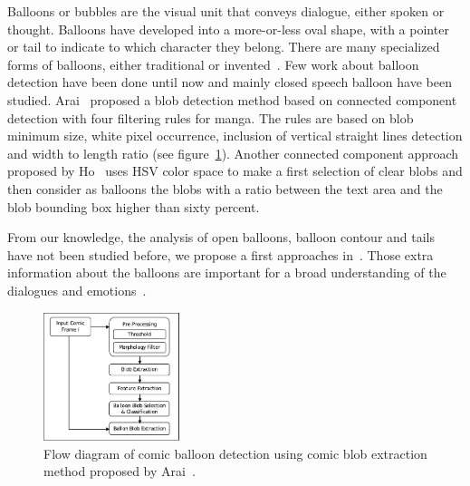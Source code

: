 Balloons or bubbles are the visual unit that conveys dialogue, either spoken or thought.
Balloons have developed into a more-or-less oval shape, with a pointer or tail to indicate to which character they belong.
There are many specialized forms of balloons, either traditional or invented~\cite{Marx2006Writing}.
Few work about balloon detection have been done until now and mainly closed speech balloon have been studied.
Arai~\cite{Arai11} proposed a blob detection method based on connected component detection with four filtering rules for manga.
The rules are based on blob minimum size, white pixel occurrence, inclusion of vertical straight lines detection and width to length ratio (see figure~\ref{fig:Arai_balloon_extraction_process}).
Another connected component approach proposed by Ho~\cite{Ho2012} uses HSV color space to make a first selection of clear blobs and then consider as balloons the blobs with a ratio between the text area and the blob bounding box higher than sixty percent.

From our knowledge, the analysis of open balloons, balloon contour and tails have not been studied before, we propose a first approaches in~.
Those extra information about the balloons are important for a broad understanding of the dialogues and emotions~\cite{millidge2009comic}.





 \begin{figure}[!ht]  %
   \centering
  \includegraphics[trim= 0px 0px 0px 0px, clip, width=150px]{figs/Arai_balloon_extraction_process.pdf}
  \caption{Flow diagram of comic balloon detection using comic blob extraction method proposed by Arai~\cite{Arai11}.}
  \label{fig:Arai_balloon_extraction_process}
 \end{figure}


